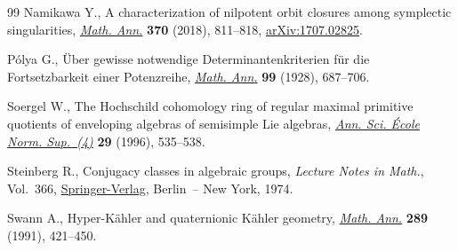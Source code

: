 \documentclass[pdftex]{sigma}
\numberwithin{equation}{section}
\begin{document}
\begin{thebibliography}{99}
Namikawa Y., A characterization of nilpotent orbit closures among symplectic
 singularities, \href{https://doi.org/10.1007/s00208-017-1572-9}{\textit{Math. Ann.}} \textbf{370} (2018), 811--818, \href{https://arxiv.org/abs/1707.02825}{arXiv:1707.02825}.

P\'olya G., \"Uber gewisse notwendige {D}eterminantenkriterien f\"ur die
 {F}ortsetzbarkeit einer {P}otenzreihe, \href{https://doi.org/10.1007/BF01459120}{\textit{Math. Ann.}} \textbf{99} (1928), 687--706.

Soergel W., The {H}ochschild cohomology ring of regular maximal primitive
 quotients of enveloping algebras of semisimple {L}ie algebras, \href{https://doi.org/10.24033/asens.1747}{\textit{Ann.
 Sci. \'Ecole Norm. Sup.~(4)}} \textbf{29} (1996), 535--538.

Steinberg R., Conjugacy classes in algebraic groups, \textit{Lecture Notes in
 Math.}, Vol.~366, \href{https://doi.org/10.1007/BFb0067854}{Springer-Verlag}, Berlin~-- New York, 1974.

Swann A., Hyper-{K}\"ahler and quaternionic {K}\"ahler geometry, \href{https://doi.org/10.1007/BF01446581}{\textit{Math.
 Ann.}} \textbf{289} (1991), 421--450.

\end{thebibliography}\LastPageEnding
\end{document}
